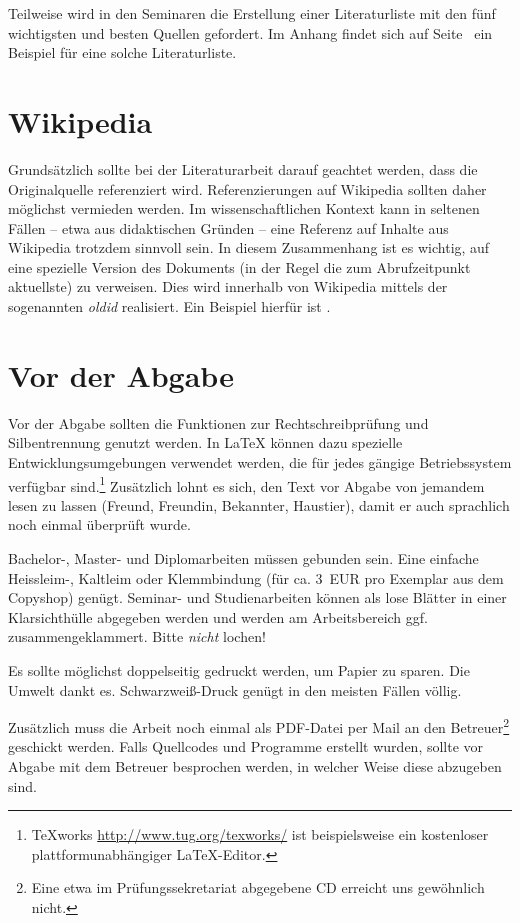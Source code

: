 \documentclass[
    fontsize=12pt,
    headings=small,
    parskip=half,           %
    bibliography=totoc,
    numbers=noenddot,       %
    open=any,               %
    ]{scrreprt}
\begin{document}
Teilweise wird in den Seminaren die Erstellung einer Literaturliste mit den fünf wichtigsten und besten Quellen gefordert. Im Anhang findet sich auf Seite~\pageref{sec:literaturliste} ein Beispiel für eine solche Literaturliste.

\section{Wikipedia}

Grundsätzlich sollte bei der Literaturarbeit darauf geachtet werden, dass die Originalquelle
referenziert wird. Referenzierungen auf Wikipedia sollten daher möglichst vermieden werden. Im wissenschaftlichen Kontext kann in seltenen Fällen -- etwa aus didaktischen Gründen -- eine Referenz auf Inhalte aus Wikipedia trotzdem sinnvoll sein. In diesem Zusammenhang ist es wichtig, auf eine spezielle Version des Dokuments (in der Regel die zum Abrufzeitpunkt aktuellste) zu verweisen. Dies wird innerhalb von Wikipedia mittels der sogenannten \emph{oldid} realisiert. Ein Beispiel hierfür ist \cite{Wiki}.

\section{Vor der Abgabe}

Vor der Abgabe sollten die Funktionen zur Rechtschreibprüfung und Silbentrennung genutzt werden. In LaTeX können dazu spezielle Entwicklungsumgebungen verwendet werden, die für jedes gängige Betriebssystem verfügbar sind.\footnote{TeXworks \url{http://www.tug.org/texworks/} ist beispielsweise ein kostenloser plattformunabhängiger LaTeX-Editor.} Zusätzlich lohnt es sich, den Text vor Abgabe von jemandem lesen zu lassen (Freund, Freundin, Bekannter, Haustier), damit er auch sprachlich noch einmal überprüft wurde.

Bachelor-, Master- und Diplomarbeiten müssen gebunden sein. Eine einfache Heissleim-, Kaltleim oder Klemmbindung (für ca. 3~EUR pro Exemplar aus dem Copyshop) genügt. Seminar- und Studienarbeiten können als lose Blätter in einer Klarsichthülle abgegeben werden und werden am Arbeitsbereich ggf. zusammengeklammert. Bitte \emph{nicht} lochen!

Es sollte möglichst doppelseitig gedruckt werden, um Papier zu sparen. Die Umwelt dankt es. Schwarzweiß-Druck genügt in den meisten Fällen völlig.

Zusätzlich muss die Arbeit noch einmal als PDF-Datei per Mail an den Betreuer\footnote{Eine etwa im Prüfungssekretariat abgegebene CD erreicht uns gewöhnlich nicht.} geschickt werden. Falls Quellcodes und Programme erstellt wurden, sollte vor Abgabe mit dem Betreuer besprochen werden, in welcher Weise diese abzugeben sind.
\end{document}
